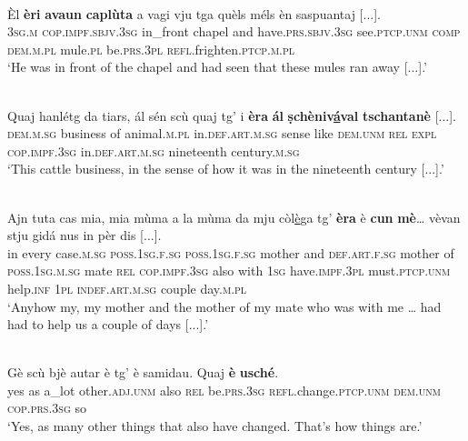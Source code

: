 \ea
\label{ex:cop:3}
\\
\gll  Èl \textbf{èri} \textbf{avaun} \textbf{caplùta} a vagi vju tga quèls méls èn saspuantaj [...].\\
\textsc{3sg.m} \textsc{cop.impf.sbjv.3sg} in\_front chapel and have.\textsc{prs.sbjv.3sg} see.\textsc{ptcp.unm} \textsc{comp} \textsc{dem.m.pl} mule.\textsc{pl} be.\textsc{prs.3pl} \textsc{refl.}frighten.\textsc{ptcp.m.pl}\\
\glt `He was in front of the chapel and had seen that these mules ran away [...].'
\z

\ea
\label{ex:cop:4}
\\
\gll Quaj hanlétg da tiars, ál sén scù quaj tg' i \textbf{èra} \textbf{ál} \textbf{ṣchèniv\underline{á}val} \textbf{tschantanè} [...].\\
	\textsc{dem.m.sg} business of animal.\textsc{m.pl} in.\textsc{def.art.m.sg} sense like \textsc{dem.unm} \textsc{rel} \textsc{expl} \textsc{cop.impf.3sg} in.\textsc{def.art.m.sg} nineteenth century.\textsc{m.sg}\\
\glt`This cattle business, in the sense of how it was in the nineteenth century [...].'
\z

\ea
\label{ex:cop:6}
\\
\gll    Ajn tuta cas mia, mia mùma a la mùma da mju còl\underline{è}ga tg’ \textbf{èra} è \textbf{cun} \textbf{mè}… vèvan stju gidá nus in pèr dis [...].\\
in every case.\textsc{m.sg} \textsc{poss.1sg.f.sg}  \textsc{poss.1sg.f.sg} mother and \textsc{def.art.f.sg} mother of  \textsc{poss.1sg.m.sg} mate \textsc{rel}  \textsc{cop.impf.3sg} also with \textsc{1sg}  have.\textsc{impf.3pl} must.\textsc{ptcp.unm} help.\textsc{inf} \textsc{1pl} \textsc{indef.art.m.sg} couple day.\textsc{m.pl}\\
\glt `Anyhow my, my mother and the mother of my mate who was with me … had had to help us a couple of days [...].'
\z

\ea
\label{ex:cop:5}
\\
\gll    Gè scù bjè autar è tg’ è samidau. Quaj \textbf{è} \textbf{usché}.\\
yes as a\_lot other.\textsc{adj.unm} also \textsc{rel} be.\textsc{prs.3sg} \textsc{refl.}change.\textsc{ptcp.unm}  \textsc{dem.unm} \textsc{cop.prs.3sg} so\\
\glt `Yes, as many other things that also have changed. That’s how things are.'
\z

